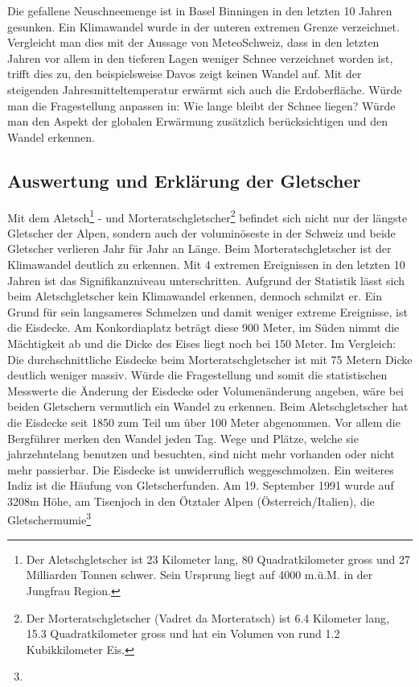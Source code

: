 \begin{refsection}
Die gefallene Neuschneemenge ist in Basel Binningen in den letzten 10 Jahren gesunken. Ein Klimawandel wurde in der unteren extremen Grenze verzeichnet. Vergleicht man dies mit der Aussage von MeteoSchweiz, dass in den letzten Jahren vor allem in den tieferen Lagen weniger Schnee verzeichnet worden ist, trifft dies zu, den beispielsweise Davos zeigt keinen Wandel auf. Mit der steigenden Jahresmitteltemperatur erwärmt sich auch die Erdoberfläche. Würde man die Fragestellung anpassen in: Wie lange bleibt der Schnee liegen? Würde man den Aspekt der globalen Erwärmung zusätzlich berücksichtigen und den Wandel erkennen.


\subsection{Auswertung und Erklärung der Gletscher}
Mit dem Aletsch\footnote{%
Der Aletschgletscher ist 23 Kilometer lang, 80 Quadratkilometer gross und 27 Milliarden Tonnen schwer. Sein Ursprung liegt auf 4000 m.ü.M. in der Jungfrau Region.}
- und Morteratschgletscher\footnote{%
Der Morteratschgletscher (Vadret da Morteratsch) ist 6.4 Kilometer lang, 15.3 Quadratkilometer gross und hat ein Volumen von rund 1.2 Kubikkilometer Eis.}
befindet sich nicht nur der längste Gletscher der Alpen, sondern auch der voluminöseste in der Schweiz und beide Gletscher verlieren Jahr für Jahr an Länge. Beim Morteratschgletscher ist der Klimawandel deutlich zu erkennen. Mit 4 extremen Ereignissen in den letzten 10 Jahren ist das Signifikanzniveau unterschritten. Aufgrund der Statistik lässt sich beim Aletschgletscher kein Klimawandel erkennen, dennoch schmilzt er. Ein Grund für sein langsameres Schmelzen und damit weniger extreme Ereignisse, ist die Eisdecke. Am Konkordiaplatz beträgt diese 900 Meter, im Süden nimmt die Mächtigkeit ab und die Dicke des Eises liegt noch bei 150 Meter. Im Vergleich: Die durchschnittliche Eisdecke beim Morteratschgletscher ist mit 75 Metern Dicke deutlich weniger massiv. 
Würde die Fragestellung und somit die statistischen Messwerte die Änderung der Eisdecke oder Volumenänderung angeben, wäre bei beiden Gletschern vermutlich ein Wandel zu erkennen. Beim Aletschgletscher hat die Eisdecke seit 1850 zum Teil um über 100 Meter abgenommen. Vor allem die Bergführer merken den Wandel jeden Tag. Wege und Plätze, welche sie jahrzehntelang benutzen und besuchten, sind nicht mehr vorhanden oder nicht mehr passierbar. Die Eisdecke ist unwiderruflich weggeschmolzen.
Ein weiteres Indiz ist die Häufung von Gletscherfunden. Am 19. September 1991 wurde auf 3208m Höhe, am Tisenjoch in den Ötztaler Alpen (Österreich/Italien), die Gletschermumie\footnote{%
}
\end{refsection}
